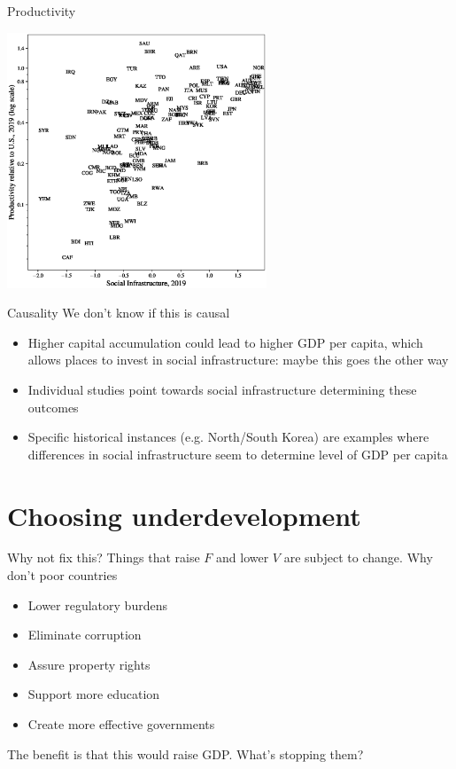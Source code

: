 \begin{frame}{Productivity}
\begin{center}
\includegraphics[height=3in]{../Figures/fig-ch8-fig3.eps}
\end{center}
\end{frame}

\begin{frame}{Causality}
We don't know if this is causal
\begin{itemize}
	\item Higher capital accumulation could lead to higher GDP per capita, which allows places to invest in social infrastructure: maybe this goes the other way
	\item Individual studies point towards social infrastructure determining these outcomes
	\item Specific historical instances (e.g. North/South Korea) are examples where differences in social infrastructure seem to determine level of GDP per capita
\end{itemize}
\end{frame}

\section{Choosing underdevelopment}
\begin{frame}{Why not fix this?}
Things that raise $F$ and lower $V$ are subject to change. Why don't poor countries
\begin{itemize}
	\item Lower regulatory burdens
	\item Eliminate corruption
	\item Assure property rights
	\item Support more education
	\item Create more effective governments
\end{itemize}
The benefit is that this would raise GDP. What's stopping them?
\end{frame}

